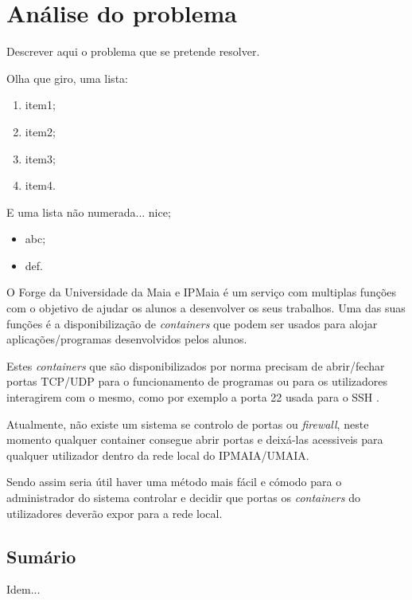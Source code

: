 \chapter{Análise do problema}
\label{cap:problem}

Descrever aqui o problema que se pretende resolver.


Olha que giro, uma lista:

\begin{enumerate}
    \item item1;
    \item item2;
    \item item3;
    \item item4.
\end{enumerate}


E uma lista não numerada... nice;

\begin{itemize}
    \item abc;
    \item def.
\end{itemize}

O Forge da Universidade da Maia e IPMaia é um serviço com multiplas funções com 
o objetivo de ajudar os alunos a desenvolver os seus trabalhos.
Uma das suas funções é a disponibilização de \textit{containers} que podem ser usados
para alojar aplicações/programas desenvolvidos pelos alunos.

Estes \textit{containers} que são disponibilizados por norma precisam de 
abrir/fechar portas TCP/UDP para o funcionamento de programas ou para os
utilizadores interagirem com o mesmo, como por exemplo a porta 22 usada para o 
SSH \cite{rfc4253}.

Atualmente, não existe um sistema se controlo de portas ou \textit{firewall}, neste momento qualquer container
consegue abrir portas e deixá-las acessiveis para qualquer utilizador dentro da rede local
do IPMAIA/UMAIA.

Sendo assim seria útil haver uma método mais fácil e cómodo para o administrador do sistema
controlar e decidir que portas os \textit{containers} do utilizadores deverão expor para a rede local.



\section*{Sumário}

Idem... 
